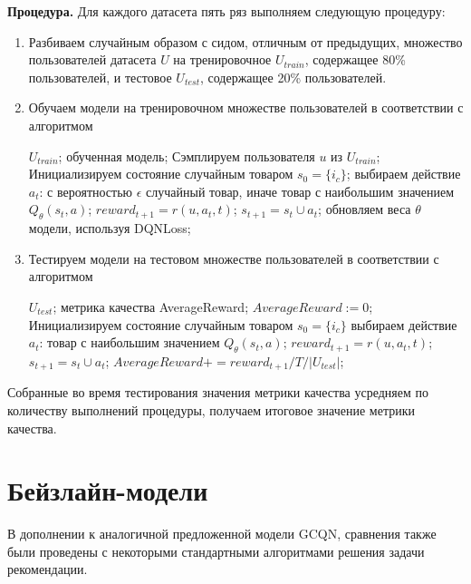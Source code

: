 \documentclass{mipt-thesis-ms}
\begin{document}
{\bf Процедура.} Для каждого датасета пять ряз выполняем следующую процедуру:
\begin{enumerate}
\item Разбиваем случайным образом с сидом, отличным от предыдущих, множество пользователей датасета $U$ на тренировочное $U_{train}$, содержащее 80\% пользователей, и тестовое $U_{test}$, содержащее 20\% пользователей.
\item Обучаем модели на тренировочном множестве пользователей в соответствии с алгоритмом
\begin{algorithmic}[1]
\REQUIRE $U_{train}$;
\ENSURE обученная модель;
    \STATE Сэмплируем пользователя $u$ из $U_{train}$;
    \STATE Инициализируем состояние случайным товаром $s_0 = \{i_c\}$;
        \STATE выбираем действие $a_t$: с вероятностью $\epsilon$ случайный товар, иначе товар с наибольшим значением $Q_{\theta}(s_t, a)$;
        \STATE ${reward}_{t+1} = r(u, a_t, t)$;
        \STATE $s_{t+1} = s_t \cup {a_t}$;
        \STATE обновляем веса $\theta$ модели, используя DQNLoss;
    \ENDFOR
\ENDFOR
\end{algorithmic}

\item Тестируем модели на тестовом множестве пользователей в соответствии с алгоритмом
\begin{algorithmic}[1]
\REQUIRE $U_{test}$;
\ENSURE метрика качества AverageReward;
\STATE $AverageReward := 0$;
    \STATE Инициализируем состояние случайным товаром $s_0 = \{i_c\}$
        \STATE выбираем действие $a_t$: товар с наибольшим значением $Q_{\theta}(s_t, a)$;
        \STATE ${reward}_{t+1} = r(u, a_t, t)$;
        \STATE $s_{t+1} = s_t \cup {a_t}$;
        \STATE $AverageReward += reward_{t+1} / T / |U_{test}|$;
    \ENDFOR
\ENDFOR
\end{algorithmic}

\end{enumerate}

Собранные во время тестирования значения метрики качества усредняем по количеству выполнений процедуры, получаем итоговое значение метрики качества.

\section{Бейзлайн-модели}

В дополнении к аналогичной предложенной модели GCQN, сравнения также были проведены с некоторыми стандартными алгоритмами решения задачи рекомендации.\\
\end{document}
